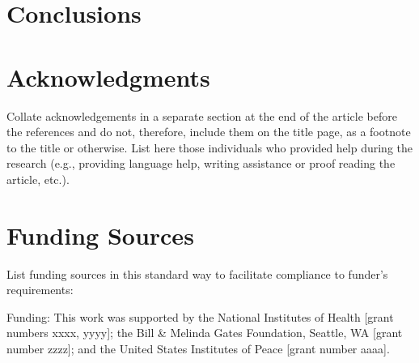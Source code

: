 \documentclass[preprint,review,12pt]{dependencies/elsarticle}
\begin{document}
\section{Conclusions}
\label{sec:conclusions}
%

\acresetall 
%
\section{Acknowledgments}
\label{sec:acknowledgments}
%
Collate acknowledgements in a separate section at the end of the article before the references and do not, therefore, include them on the title page, as a footnote to the title or otherwise.
List here those individuals who provided help during the research (e.g., providing language help, writing assistance or proof reading the article, etc.).
%
\section{Funding Sources}
\label{sec:funding_sources}
%
List funding sources in this standard way to facilitate compliance to funder's requirements:

Funding: This work was supported by the National Institutes of Health [grant numbers xxxx, yyyy]; the Bill \& Melinda Gates Foundation, Seattle, WA [grant number zzzz]; and the United States Institutes of Peace [grant number aaaa].
\end{document}
